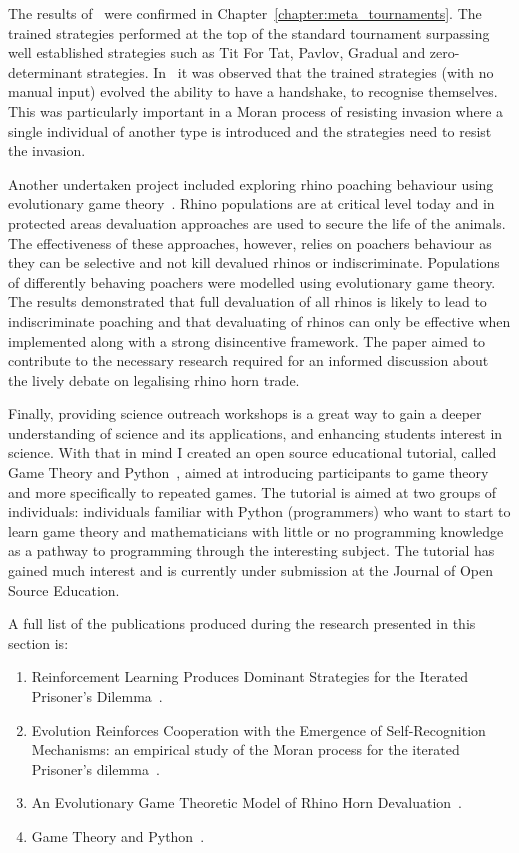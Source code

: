 The results of~\cite{Knight2017} were confirmed in
Chapter~\ref{chapter:meta_tournaments}. The trained strategies performed at
the top of the standard tournament surpassing well established
strategies such as Tit For Tat, Pavlov, Gradual and zero-determinant strategies.
In~\cite{Harper2017} it was observed that the trained strategies (with no manual
input) evolved the ability to have a handshake, to recognise themselves. This
was particularly important in a Moran process of resisting invasion where a
single individual of another type is introduced and the strategies need to
resist the invasion.

Another undertaken project included exploring rhino poaching behaviour using
evolutionary game theory~\cite{Glynatsi2018}. Rhino populations are at critical
level today and in protected areas devaluation approaches are used to secure the
life of the animals. The effectiveness of these approaches, however, relies on
poachers behaviour as they can be selective and not kill devalued rhinos or
indiscriminate. Populations of differently behaving poachers were modelled using
evolutionary game theory. The results
demonstrated that full devaluation of all rhinos is likely to lead to
indiscriminate poaching and that devaluating of rhinos can only be effective
when implemented along with a strong disincentive framework. The paper aimed to
contribute to the necessary research required for an informed discussion about
the lively debate on legalising rhino horn trade.

Finally, providing science outreach workshops is a great way to gain a deeper
understanding of science and its applications, and enhancing students interest
in science. With that in mind I created an open source educational tutorial, called Game
Theory and Python~\cite{Glynatsi2017_game}, aimed at introducing participants to %
game theory and more specifically to repeated games. The tutorial is
aimed at two groups of individuals: individuals familiar with Python (programmers) who want
to start to learn game theory and mathematicians with little or no programming
knowledge as a pathway to programming through the interesting subject. The
tutorial has gained much interest and is currently under submission at the
Journal of Open Source Education.

A full list of the publications produced during the research presented in this
section is:

\begin{enumerate}
    \item Reinforcement Learning Produces Dominant Strategies for the
    Iterated Prisoner's Dilemma~\cite{Knight2017}.
    \item Evolution Reinforces Cooperation with the Emergence of Self-Recognition
    Mechanisms: an empirical study of the Moran process for the iterated
    Prisoner's dilemma~\cite{Harper2017}.
    \item An Evolutionary Game Theoretic Model of Rhino Horn Devaluation~\cite{Glynatsi2018}.
    \item Game Theory and Python~\cite{Glynatsi2017_game}.
\end{enumerate}

